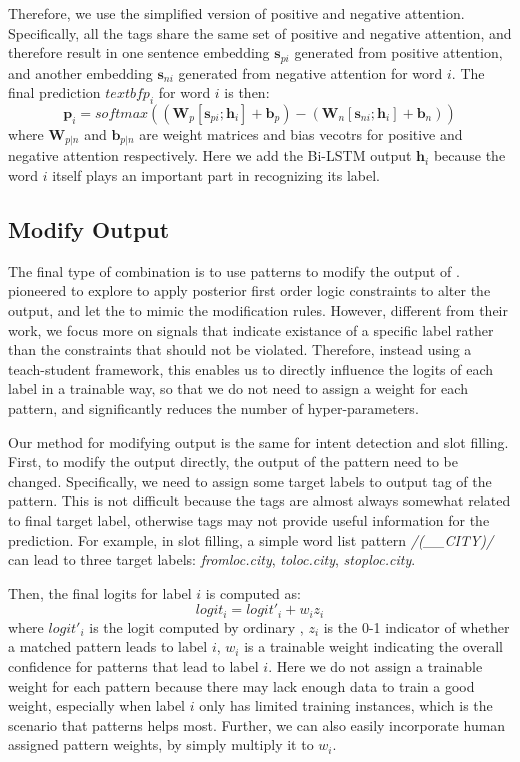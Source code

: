 Therefore, we use the simplified version of positive and negative attention. Specifically, all the tags share the same set of positive and negative attention, and therefore result in one sentence embedding $\textbf{s}_{pi}$ generated from positive attention, and another embedding $\textbf{s}_{ni}$ generated from negative attention for word $i$. The final prediction $textbf{p}_i$ for word $i$ is then:
\begin{equation}
\textbf{p}_i = softmax((\textbf{W}_p [\textbf{s}_{pi}; \textbf{h}_i] + \textbf{b}_p) - (\textbf{W}_n [\textbf{s}_{ni}; \textbf{h}_i] + \textbf{b}_n)) 
\end{equation} 
where $\textbf{W}_{p|n}$ and $\textbf{b}_{p|n}$ are weight matrices and bias vecotrs for positive and negative attention respectively. Here we add the Bi-LSTM output $\textbf{h}_i$ because the word $i$ itself plays an important part in recognizing its label.

\subsection{Modify Output}
The final type of combination is to use \RE patterns to modify the output of \NN. \cite{hu2016harnessing} pioneered to explore to apply posterior first order logic constraints to alter the \NN output, and let the \NN to mimic the modification rules. However, different from their work, we focus more on signals that indicate existance of a specific label rather than the constraints that should not be violated. Therefore, instead using a teach-student framework, this enables us to directly influence the logits of each label in a trainable way, so that we do not need to assign a weight for each pattern, and significantly reduces the number of hyper-parameters.

Our method for modifying output is the same for intent detection and slot filling.
First, to modify the output directly, the output of the \RE pattern need to be changed. Specifically, we need to assign some target labels to output tag of the \RE pattern. This is not difficult because the \RE tags are almost always somewhat related to final target label, otherwise \RE tags may not provide useful information for the prediction. For example, in slot filling, a simple word list pattern \textsl{/(\_\_CITY)/} can lead to three target labels: \emph{fromloc.city}, \emph{toloc.city}, \emph{stoploc.city}.

Then, the final logits for label $i$ is computed as: 
\begin{equation}
logit_i = logit'_i + w_i z_i
\end{equation}
where $logit'_i$ is the logit computed by ordinary \NN, $z_i$ is the 0-1 indicator of whether a matched pattern leads to label $i$, $w_i$ is a trainable weight indicating the overall confidence for patterns that lead to label $i$. Here we do not assign a trainable weight for each pattern because there may lack enough data to train a good weight, especially when label $i$ only has limited training instances, which is the scenario that \RE patterns helps most. Further, we can also easily incorporate human assigned pattern weights, by simply multiply it to $w_i$.

